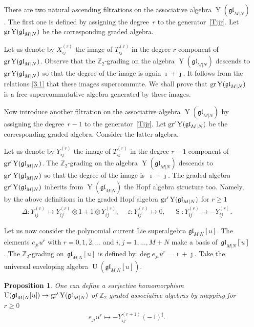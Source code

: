 \documentclass[pdftex]{sigma}
\numberwithin{equation}{section}
\newtheorem{Proposition}[Theorem]{Proposition}
\def\bi{{\bar\imath }}
\def\bj{{\bar\jmath }}
\def\De{\Delta}
\def\ep{\varepsilon}
\def\g{\glMN [u]}
\def\ge{\geqslant}
\def\glMN{\mathfrak{gl}_{M|N}}
\def\gr{{\rm gr} }
\def\grpr{{\rm gr}^{\prime} }
\def\ot{\otimes}
\def\S{\operatorname{S}}
\def\Ug{\operatorname{U}(\g)}
\def\YMN{\operatorname{Y}(\glMN)}
\def\ZZ{\mathbb{Z}}
\begin{document}
There are two natural
ascending filtrations on
the associative algebra $\YMN $. The first one is defined by
assigning the degree~$r$ to the generator~\eqref{Tijr}.
Let $\gr\YMN$ be the corresponding graded algebra.

Let us denote by $X_{ij}^{(r)}$ the image of $T_{ij}^{(r)}$
in the degree $r$ component of $\gr\YMN $.
Observe that the $\ZZ_2 $-grading on the algebra $\YMN$ descends to
$\gr\YMN$ so that the degree of the image is again
$\bi + \bj $. It follows from the relations \eqref{3.1}
that these images supercommute.
We shall prove that
$\gr\YMN$ is a free supercommutative algebra generated by
these images.

Now introduce another filtration on the associative algebra $\YMN$
by assigning the deg\-ree~$r-1$ to the generator~\eqref{Tijr}.
Let $\grpr\YMN$ be the corresponding graded algebra.
Consider the latter algebra.

Let us denote by $Y_{ij}^{(r)}$ the image of $T_{ij}^{(r)}$
in the degree $r-1$ component of $\grpr\YMN $.
The $\ZZ_2 $-grading on the algebra
$\YMN$ descends to
$\grpr\YMN$ so that the degree of the image is~$\bi + \bj $.
The graded algebra $\grpr\YMN$ inherits from $\YMN$ the Hopf algebra structure too.
Namely, by the above definitions in
the graded Hopf algebra $\grpr\YMN$ for $r\ge1$ %
\begin{gather}
\label{grprH}
\De: Y_{ij}^{(r)}\mapsto Y_{ij}^{(r)}\ot1+1\ot Y_{ij}^{(r)} ,
\ \quad
\ep: Y_{ij}^{(r)}\mapsto0 ,
\ \quad
\S: Y_{ij}^{(r)}\mapsto- Y_{ij}^{(r)} .
\end{gather}

Let us now consider the polynomial current Lie superalgebra $\g $.
The elements $e_{ji} u^{r}$ with $r=0 ,1 ,2 , \dots$
and $i ,j=1 ,\dots, M+N$ make a basis of~$\g $.
The $\ZZ_{2}$-grading on~$\g$ is defined by
$\deg e_{ji} u^{r}=\bi+\bj $. Take
the universal enveloping algebra $\Ug $.

\begin{Proposition}
\label{P21}
One can define a surjective homomorphism $\Ug\to\grpr\YMN$
of $\ZZ_2$-graded associative algebras by mapping for $r\ge0$
\begin{gather}
\label{UY}
e_{ji} u^r\mapsto- Y_{ij}^{(r+1)} {(-1)}^{\bj} .
\end{gather}
\end{Proposition}
\end{document}
